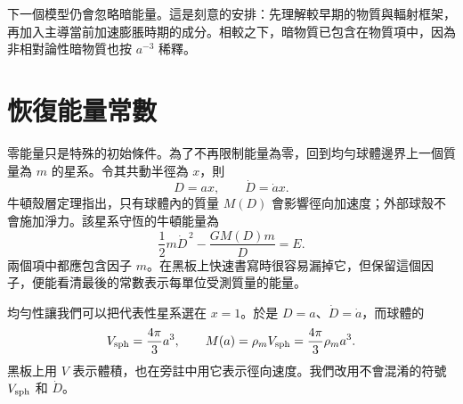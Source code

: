 \begin{classroomqa}
\end{classroomqa}

下一個模型仍會忽略暗能量。這是刻意的安排：先理解較早期的物質與輻射框架，再加入主導當前加速膨脹時期的成分。相較之下，暗物質已包含在物質項中，因為非相對論性暗物質也按 \(a^{-3}\) 稀釋。

\begin{classroomqa}
\end{classroomqa}

\section{恢復能量常數}

零能量只是特殊的初始條件。為了不再限制能量為零，回到均勻球體邊界上一個質量為 \(m\) 的星系。令其共動半徑為 \(x\)，則
\begin{equation}
D=ax,
\qquad
\dot D=\dot a x.
\label{eq:c02-comoving-particle}
\end{equation}
牛頓殼層定理指出，只有球體內的質量 \(M(D)\) 會影響徑向加速度；外部球殼不會施加淨力。該星系守恆的牛頓能量為
\begin{equation}
\frac{1}{2}m\dot D^{\,2}-\frac{GM(D)m}{D}=E.
\label{eq:c02-newton-energy}
\end{equation}
兩個項中都應包含因子 \(m\)。在黑板上快速書寫時很容易漏掉它，但保留這個因子，便能看清最後的常數表示每單位受測質量的能量。

均勻性讓我們可以把代表性星系選在 \(x=1\)。於是 \(D=a\)、\(\dot D=\dot a\)，而球體的
\begin{equation}
V_{\rm sph}=\frac{4\pi}{3}a^3,
\qquad
M(a)=\rho_m V_{\rm sph}=\frac{4\pi}{3}\rho_m a^3.
\label{eq:c02-enclosed-mass}
\end{equation}
黑板上用 \(V\) 表示體積，也在旁註中用它表示徑向速度。我們改用不會混淆的符號 \(V_{\rm sph}\) 和 \(\dot D\)。

